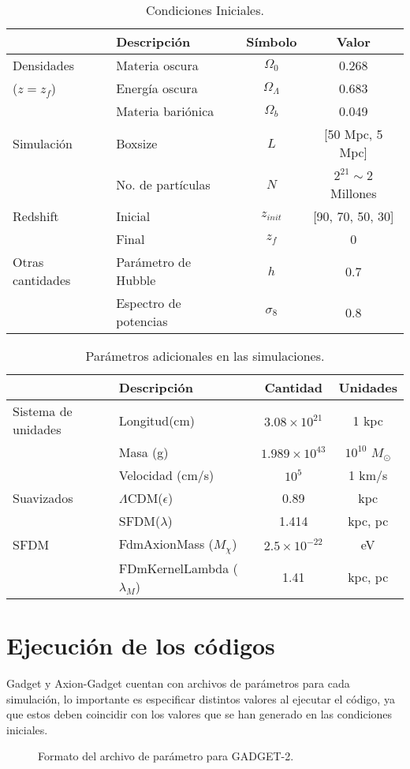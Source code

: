 \documentclass[a4paper,openright,12pt]{book}
\begin{document}
\begin{table}[]%
\caption{Condiciones Iniciales.}
\label{Tabla 4.1}\centering%
\begin{tabular}{llcc}
\toprule%
&Descripción&Símbolo&Valor\\\toprule%
Densidades& Materia oscura&$\Omega_{0}$&0.268\\
($z=z_{f}$)&Energía oscura&$\Omega_{\Lambda}$&0.683\\
&Materia bariónica&$\Omega_{b}$&0.049\\\midrule
Simulación&Boxsize&$L$&[50 Mpc, 5 Mpc]\\\
&No. de partículas&$N$&$2^{21}\sim$2 Millones\\\midrule
Redshift&Inicial&$z_{init}$&[90, 70, 50, 30]\\
&Final&$z_{f}$&0\\\midrule
Otras cantidades&Parámetro de Hubble&$h$&0.7\\
&Espectro de potencias&$\sigma_{8}$&0.8\\\bottomrule
\end{tabular}
\end{table}

\begin{table}[]%
\caption{Parámetros adicionales en las simulaciones.}
\label{Tabla 4.2}\centering%
\begin{tabular}{llcc}
\toprule%
&Descripción&Cantidad&Unidades\\\toprule%
Sistema de unidades&Longitud(cm)&$3.08\times10^{21}$&1 kpc\\
&Masa (g)&$1.989\times10^{43}$&$10^{10}$ $M_{\odot}$\\
&Velocidad (cm/s)&$10^{5}$&1 km/s\\\midrule
Suavizados&$\Lambda$CDM($\epsilon$)&0.89&kpc\\
&SFDM($\lambda$)&1.414& kpc, pc\\\midrule
SFDM&FdmAxionMass ($M_{\chi}$)&$2.5\times10^{-22}$&eV\\
&FDmKernelLambda ($\lambda_{M}$)&1.41&kpc, pc\\\bottomrule

\end{tabular}

\end{table}


\section{Ejecución de los códigos}
Gadget y Axion-Gadget cuentan con archivos de parámetros para cada simulación, lo importante es especificar distintos valores al ejecutar el código, ya que estos deben coincidir con los valores que se han generado en las condiciones iniciales.
\begin{figure}[]
\centering
{}
\caption{\footnotesize{Formato del archivo de parámetro para GADGET-2.}} \label{fig 4.1}
\end{figure}
\end{document}
